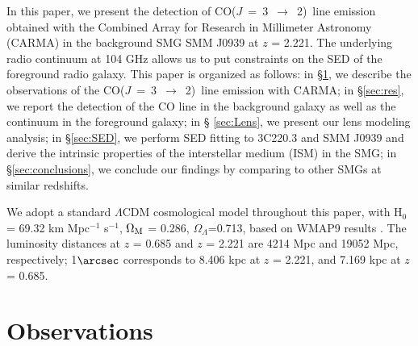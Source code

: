 \documentclass[twocolumn,apj,numberedappendix]{emulateapj}
\newcommand{\CO}{\mbox{CO($J$ = 3 $\rightarrow$ 2) }}
\newcommand{\pmOne}{$^{-1}$}
\begin{document}
In this paper, we present the detection of \CO line emission obtained with the Combined
Array for Research in Millimeter Astronomy (CARMA) in the background SMG
SMM J0939 at $z$ = 2.221. The underlying radio continuum at 104 GHz allows us to put constraints on the SED of the 
foreground radio galaxy. This paper is organized as follows: in \S \ref{sec:obs}, we describe the
observations of the \CO line emission with CARMA; in \S \ref{sec:res}, we report the
detection of the CO line in the background galaxy as well as the continuum in the foreground galaxy; in \S
\ref{sec:Lens}, we present our lens modeling analysis; in \S \ref{sec:SED}, we perform SED fitting to 3C220.3
and SMM J0939 and derive the intrinsic properties of the interstellar medium (ISM) in the SMG; in \S \ref{sec:conclusions}, we
conclude our findings by comparing to other SMGs at similar redshifts.

We adopt a standard $\Lambda$CDM cosmological model throughout this paper, with H$_0$= 69.32 km Mpc\pmOne
s\pmOne, $\Omega_{\rm M}$ = 0.286, $\Omega_\Lambda$=0.713, based on WMAP9 results \citep{Hinshaw13a}.
The luminosity distances at $z$ = 0.685 and $z$ = 2.221 are 4214 Mpc and 19052 Mpc, respectively; 1$\arcsec$
corresponds to 8.406 kpc at $z$ = 2.221, and 7.169 kpc at $z$ = 0.685.

\section{Observations}\label{sec:obs}
\end{document}
